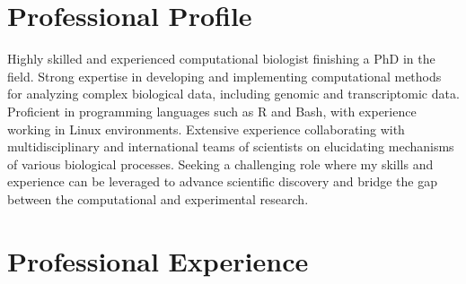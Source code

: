 \documentclass[11pt,a4paper,]{awesome-cv}
\begin{document}
\makecvheader






\hypertarget{professional-profile}{%
\section{Professional Profile}\label{professional-profile}}

Highly skilled and experienced computational biologist finishing a PhD
in the field. Strong expertise in developing and implementing
computational methods for analyzing complex biological data, including
genomic and transcriptomic data. Proficient in programming languages
such as R and Bash, with experience working in Linux environments.
Extensive experience collaborating with multidisciplinary and
international teams of scientists on elucidating mechanisms of various
biological processes. Seeking a challenging role where my skills and
experience can be leveraged to advance scientific discovery and bridge
the gap between the computational and experimental research.

\hypertarget{professional-experience}{%
\section{Professional Experience}\label{professional-experience}}
\end{document}
